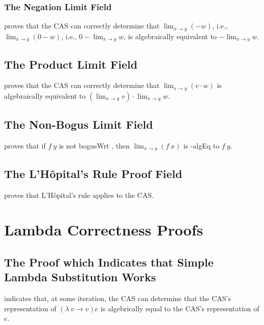 \documentclass{report}
\begin{document}
\subsubsection{The Negation Limit Field}
  proves that the  CAS can correctly determine that \(\lim_{x \rightarrow y} \left(- w\right)\), i.e., \(\lim_{x \rightarrow y} \left(0 - w\right)\), i.e., \(0 - \lim_{x \rightarrow y} w\), is algebraically equivalent to \(- \lim_{x \rightarrow y} w\).

\subsection{The Product Limit Field}
  proves that the  CAS can correctly determine that \(\lim_{x \rightarrow y} \left(v \cdot w\right)\) is algebraically equivalent to \(\left(\lim_{x \rightarrow y} v\right) \cdot \lim_{x \rightarrow y} w\).

\subsection{The Non-Bogus Limit Field}
  proves that if \(f\ y\) is not \gls{bogusWrt} , then \(\lim_{x \rightarrow y} \left(f\ x\right)\) is -\gls{algEq} to \(f\ y\).

\subsection{The L'H\^opital's Rule Proof Field}
  proves that L'H\^opital's rule applies to the  CAS.

\section{Lambda Correctness Proofs}

\subsection{The Proof which Indicates that Simple Lambda Substitution Works}
  indicates that, at some iteration, the  CAS can determine that the  CAS's representation of \(\left(\lambda\ v \rightarrow v\right) e\) is algebrically equal to the  CAS's representation of \(e\).
\end{document}
